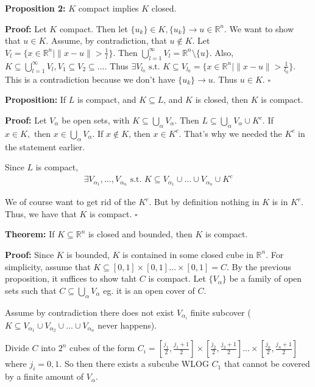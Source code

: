 \documentclass{article}
\newcommand*{\qed}{\hfill$\square$}%
\newcommand*{\txt}[1]{\text{ #1 }}%
\newcommand*{\rr}{\mathbb{R}}%
\begin{document}
\textbf{Proposition 2:} $K$ compact implies $K$ closed. 

\textbf{Proof:} Let $K$ compact. Then let $\{u_k\}\in K, \{u_k\}\to u\in \rr^n$. We want to show that $u\in K$. Assume, by contradiction, that $u\notin K$. Let $V_{l}=\{x\in \rr^n|\|x-u\|>\frac{1}{l}\}$. Then $\bigcup_{l=1}^\infty V_l=\rr^n\setminus \{u\}$. Also, $K\subseteq \bigcup_{l=1}^\infty V_l, V_1\subseteq V_2\subseteq\dots$. Thus $\exists V_{l_0}\txt{s.t.}K\subseteq V_{l_0}=\{x\in\rr^n|\|x-u\|>\frac{1}{l_0}\}$. This is a contradiction because we don't have $\{u_k\}\to u$. Thus $u\in K$. \qed

\textbf{Proposition:} If $L$ is compact, and $K\subseteq L$, and $K$ is closed, then $K$ is compact. 

\textbf{Proof:} Let $V_\alpha$ be open sets, with $K\subseteq \bigcup_{\alpha}V_\alpha$. Then $L\subseteq \bigcup_{\alpha}V_\alpha\cup K^c$. If $x\in K,\txt{then}x\in \bigcup_{\alpha}V_\alpha$. If $x\notin K$, then $x\in K^c$. That's why we needed the $K^c$ in the statement earlier. 

Since $L$ is compact, \begin{align*}
    \exists V_{\alpha_1},\dots,V_{\alpha_n}\txt{s.t.}K\subseteq V_{\alpha_1}\cup\dots\cup V_{\alpha_n}\cup K^c
\end{align*}

We of course want to get rid of the $K^c$. But by definition nothing in $K$ is in $K^c$. Thus, we have that $K$ is compact. \qed

\textbf{Theorem:} If $K\subseteq \rr^n$ is closed and bounded, then $K$ is compact. 

\textbf{Proof:} Since $K$ is bounded, $K$ is contained in some closed cube in $\rr^n$. For simplicity, assume that $K\subseteq[0,1]\times[0,1]\dots\times[0,1]=C$. By the previous proposition, it suffices to show taht $C$ is compact. Let $\{V_\alpha\}$ be a family of open sets such that $C\subseteq \bigcup_{\alpha}V_\alpha$ eg. it is an open cover of $C$.

Assume by contradiction there does not exist $V_{\alpha_i}$ finite subcover ($K\subseteq V_{\alpha_1}\cup V_{\alpha_2}\cup\dots\cup V_{\alpha_n}$ never happens). 

Divide $C$ into $2^n$ cubes of the form $C_i=[\frac{j_1}{2},\frac{j_1+1}{2}]\times[\frac{j_2}{2},\frac{j_2+1}{2}]\dots\times[\frac{j_n}{2},\frac{j_n+1}{2}]$ where $j_i=0,1$. So then there exists a subcube WLOG $C_1$ that cannot be covered by a finite amount of $V_\alpha$. 
\end{document}
